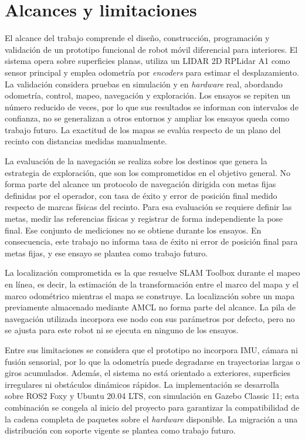 \section*{Alcances y limitaciones}
{}
\label{sec:alcances}

El alcance del trabajo comprende el diseño, construcción, programación y validación de un prototipo funcional de robot móvil diferencial para interiores. El sistema opera sobre superficies planas, utiliza un \gls{LIDAR} 2D RPLidar A1 como sensor principal y emplea odometría por \textit{encoders} para estimar el desplazamiento. La validación considera pruebas en simulación y en \textit{hardware} real, abordando odometría, control, mapeo, navegación y exploración. Los ensayos se repiten un número reducido de veces, por lo que sus resultados se informan con intervalos de confianza, no se generalizan a otros entornos y ampliar los ensayos queda como trabajo futuro. La exactitud de los mapas se evalúa respecto de un plano del recinto con distancias medidas manualmente.

La evaluación de la navegación se realiza sobre los destinos que genera la
estrategia de exploración, que son los comprometidos en el objetivo general.
No forma parte del alcance un protocolo de navegación dirigida con metas fijas
definidas por el operador, con tasa de éxito y error de posición final medido
respecto de marcas físicas del recinto. Para esa evaluación se requiere definir
las metas, medir las referencias físicas y registrar de forma independiente la
pose final. Ese conjunto de mediciones no se obtiene durante los ensayos.
En consecuencia, este trabajo no informa tasa de éxito ni error de posición
final para metas fijas, y ese ensayo se plantea como trabajo futuro.

La localización comprometida es la que resuelve SLAM Toolbox durante el mapeo
en línea, es decir, la estimación de la transformación entre el marco del mapa
y el marco odométrico mientras el mapa se construye. La localización sobre un
mapa previamente almacenado mediante AMCL no forma parte del alcance. La pila
de navegación utilizada incorpora ese nodo con sus parámetros por defecto,
pero no se ajusta para este robot ni se ejecuta en ninguno de los ensayos.

Entre sus limitaciones se considera que el prototipo no incorpora \gls{IMU}, cámara ni fusión sensorial, por lo que la odometría puede degradarse en trayectorias largas o giros acumulados. Además, el sistema no está orientado a exteriores, superficies irregulares ni obstáculos dinámicos rápidos. La implementación se desarrolla sobre \gls{ROS2} Foxy y Ubuntu 20.04 LTS, con simulación en Gazebo Classic 11; esta combinación se congela al inicio del proyecto para garantizar la compatibilidad de la cadena completa de paquetes sobre el \textit{hardware} disponible. La migración a una distribución con soporte vigente se plantea como trabajo futuro.

